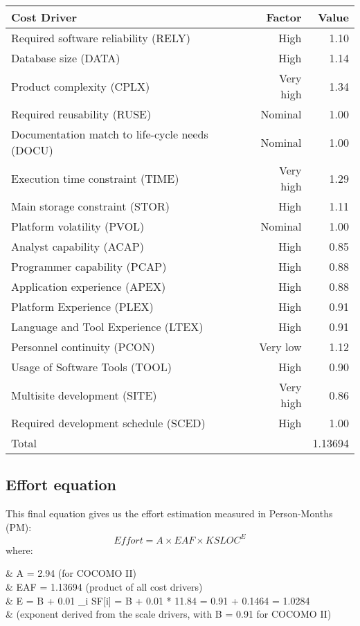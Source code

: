 \begin{table}[H]
	\centering
	\begin{tabular}{|l|r|r|}
		\hline
		Cost Driver & Factor & Value \\
		\hline
		Required software reliability (RELY) & High & 1.10
\\
		Database size (DATA) & High & 1.14 \\
		Product complexity (CPLX) & Very high & 1.34
\\
		Required reusability (RUSE) & Nominal & 1.00
\\
		Documentation match to life-cycle needs (DOCU) & Nominal & 1.00
\\
		Execution time constraint (TIME) & Very high & 1.29
\\
		Main storage constraint (STOR) & High & 1.11
\\
		Platform volatility (PVOL) & Nominal & 1.00
\\
		Analyst capability (ACAP) & High & 0.85
\\
		Programmer capability (PCAP) & High & 0.88
\\
		Application experience (APEX) & High & 0.88 \\
		Platform Experience (PLEX) & High & 0.91
\\
		Language and Tool Experience (LTEX) & High & 0.91
\\
		Personnel continuity (PCON) & Very low & 1.12
\\
		Usage of Software Tools (TOOL) & High & 0.90
\\
		Multisite development (SITE) & Very high & 0.86
\\
		Required development schedule (SCED) & High & 1.00 \\
		\hline
		\multicolumn{2}{|l|}{Total} & 1.13694 \\
		\hline	
	\end{tabular}
\end{table}

\subsection{Effort equation}
This final equation gives us the effort estimation measured in Person-Months (PM):
\[ Effort = A \times EAF \times KSLOC^E \]
where:
\begin{nospaceflalign*}
	& A = 2.94 \textnormal{ (for COCOMO II)} \phantom{\sum} \\
	& EAF = 1.13694 \textnormal{ (product of all cost drivers)} \\
	& E = B + 0.01 \times \sum_{i} SF[i] = B + 0.01 * 11.84 = 0.91 + 0.1464 = 1.0284 \\
	& \textnormal{(exponent derived from the scale drivers, with B = 0.91 for COCOMO II)} \\
\end{nospaceflalign*}

